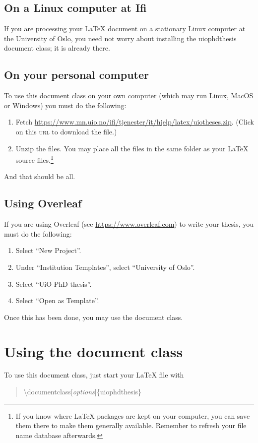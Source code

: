 \documentclass[UKenglish, thumbmarks]{uiophdthesis}
\newcommand{\bsl}{\textbackslash}
\newcommand{\p}[1]{\textsf{#1}}
\newcommand{\pcmd}[1]{\p{\bsl #1}}
\newcommand{\ppar}[1]{\p{\{#1\}}}
\begin{document}
\section{On a Linux computer at Ifi}
If you are processing your \LaTeX{} document on a stationary Linux
computer at the University of Oslo, you need not worry about
installing the \p{uiophdthesis} document class; it is already there.

\section{On your personal computer\label{privat-pc}}
To use this document class on your own computer (which may run Linux, MacOS
or Windows) you must do the following:
\begin{enumerate}
\item Fetch
  \url{https://www.mn.uio.no/ifi/tjenester/it/hjelp/latex/uiotheses.zip}. (Click
  on this \textsc{url} to download the file.)
  
\item Unzip the files. You may place all the files in the same folder
  as your \LaTeX{} source files.\footnote{If you know where \LaTeX{}
    packages are kept on your computer, you 
    can save them there to make them generally available. Remember to
    refresh your file name database afterwards.}
\end{enumerate}
And that should be all.

\section{Using Overleaf}
If you are using Overleaf (see \url{https://www.overleaf.com}) to
write your thesis, you must do the following:
\begin{enumerate}
\item Select ``New Project''.

\item Under ``Institution Templates'', select ``University of Oslo''.

\item Select ``UiO PhD thesis''.

\item Select ``Open as Template''.
\end{enumerate}
Once this has been done, you may use the document class.

\chapter{Using the document class}
To use this document class, just start your \LaTeX{} file with
\begin{quote}
  \pcmd{documentclass[\emph{options}]}\ppar{uiophdthesis}
\end{quote}
\end{document}
